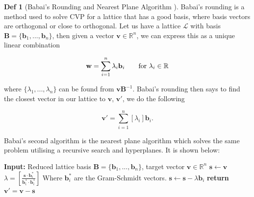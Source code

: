 \documentclass[a4paper, 10pt]{article}
\theoremstyle{definition}
\newtheorem{definition}{Def}[section]
\begin{document}
\begin{definition}[Babai's Rounding and Nearest Plane Algorithm \cite{10.1007/BFb0023990}]
    Babai's rounding is a method used to solve \ac{CVP} for a lattice that has a good basis, where basis vectors are orthogonal or close to orthogonal. Let us have a lattice $\mathcal{L}$ with basis $\mathbf{B} = \{\mathbf{b}_1,...,\mathbf{b}_n\}$, then given a vector $\mathbf{v}\in \mathbb{R}^n$, we can express this as a unique linear combination

    \[\mathbf{w}=\sum_{i=1}^n \lambda _i \mathbf{b}_i \mbox{\qquad for } \lambda_i \in \mathbb{R}\]

    where $\{\lambda_1,...,\lambda_n\}$ can be found from $\mathbf{vB}^{-1}$. Babai's rounding then says to find the closest vector in our lattice to $\mathbf{v}$, $\mathbf{v}'$, we do the following

    \[\mathbf{v}'=\sum_{i=1}^n\left[\lambda_i\right]\mathbf{b}_i\mbox{.}\]

    Babai's second algorithm is the nearest plane algorithm which solves the same problem utilising a recursive search and hyperplanes. It is shown below:

    \begin{algorithm}[h]
        \caption{Babai's nearest plane algorithm}
        \begin{algorithmic}[1]
        \State \textbf{Input:} Reduced lattice basis $\mathbf{B} = \{\mathbf{b}_1,...,\mathbf{b}_n\}$, target vector $\mathbf{v}\in\mathbb{R}^n$
        \State $\mathbf{s} \gets \mathbf{v}$
            \State $\lambda = [\frac{\mathbf{s}\cdot \mathbf{b}^*_i}{\mathbf{b}_i^*\cdot \mathbf{b}_i^*}]$ \Comment Where $\mathbf{b}_i^*$ are the Gram-Schmidt vectors.
            \State $\mathbf{s} \gets \mathbf{s} - \lambda\mathbf{b}_i$
        \EndFor
        \State \textbf{return} $\mathbf{v}' = \mathbf{v} - \mathbf{s}$
        \end{algorithmic}
    \end{algorithm}
\end{definition}
\end{document}
